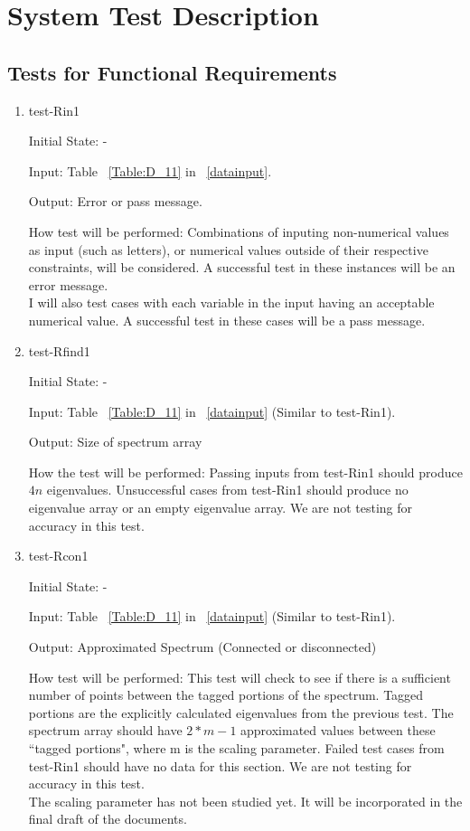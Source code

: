 \documentclass[12pt, titlepage]{article}
\begin{document}
\section{System Test Description}
	
\subsection{Tests for Functional Requirements}
\label{FRtests}
\begin{enumerate}
\item{test-Rin1\\}	
				
Initial State: -
					
Input: Table ~\ref{Table:D_11} in ~\ref{datainput}.
					
Output: Error or pass message.
					
How test will be performed: Combinations of inputing non-numerical values as 
input  (such as letters), or numerical values outside of their respective 
constraints, will be considered. A successful test in these instances will be 
an error message. \\
I will also test cases with each variable in the input having an 
acceptable numerical value. A successful test in these cases will be a pass 
message. 
					
\item{test-Rfind1} 

Initial State: - 

Input: Table ~\ref{Table:D_11} in ~\ref{datainput} (Similar to test-Rin1).

Output: Size of spectrum array 

How the test will be performed: Passing inputs from test-Rin1 should produce 
$4n$ eigenvalues. Unsuccessful cases 
from test-Rin1 should produce no eigenvalue array 
or an empty eigenvalue array. We are not testing for accuracy in this test.

\item{test-Rcon1} 

Initial State: -

Input: Table ~\ref{Table:D_11} in ~\ref{datainput} (Similar to test-Rin1).

Output: Approximated Spectrum (Connected or disconnected)

How test will be performed: This test will check to see if there is a 
sufficient number of points between the tagged portions of the spectrum. Tagged 
portions are the explicitly calculated eigenvalues from the previous test. The 
spectrum array should have $2*m-1$ approximated values between these ``tagged 
portions", where m is the scaling parameter. 
Failed test cases from test-Rin1 should have no data for this section. 
We are not testing for accuracy in this test.\\
 The scaling parameter has not 
been studied yet. It will be incorporated in the final draft of the documents.


\end{enumerate}
\end{document}
